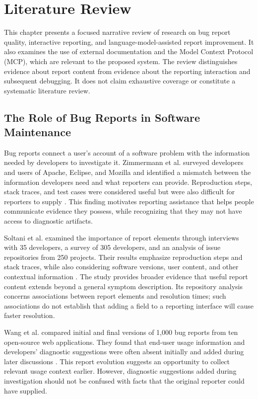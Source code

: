 \chapter{Literature Review}
\label{chap:lr}

This chapter presents a focused narrative review of research on bug report quality, interactive reporting, and language-model-assisted report improvement. It also examines the use of external documentation and the Model Context Protocol (MCP), which are relevant to the proposed system. The review distinguishes evidence about report content from evidence about the reporting interaction and subsequent debugging. It does not claim exhaustive coverage or constitute a systematic literature review.

\section{The Role of Bug Reports in Software Maintenance}

Bug reports connect a user's account of a software problem with the information needed by developers to investigate it. Zimmermann et al. surveyed developers and users of Apache, Eclipse, and Mozilla and identified a mismatch between the information developers need and what reporters can provide. Reproduction steps, stack traces, and test cases were considered useful but were also difficult for reporters to supply \cite{zimmermann2010}. This finding motivates reporting assistance that helps people communicate evidence they possess, while recognizing that they may not have access to diagnostic artifacts.

Soltani et al. examined the importance of report elements through interviews with 35 developers, a survey of 305 developers, and an analysis of issue repositories from 250 projects. Their results emphasize reproduction steps and stack traces, while also considering software versions, user content, and other contextual information \cite{soltani2020}. The study provides broader evidence that useful report content extends beyond a general symptom description. Its repository analysis concerns associations between report elements and resolution times; such associations do not establish that adding a field to a reporting interface will cause faster resolution.

Wang et al. compared initial and final versions of 1,000 bug reports from ten open-source web applications. They found that end-user usage information and developers' diagnostic suggestions were often absent initially and added during later discussions \cite{wang2025}. This report evolution suggests an opportunity to collect relevant usage context earlier. However, diagnostic suggestions added during investigation should not be confused with facts that the original reporter could have supplied.

